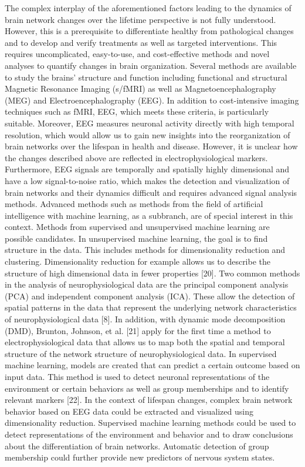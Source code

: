The complex interplay of the aforementioned factors leading to the dynamics of brain network changes over the lifetime perspective is not fully understood. However, this is a prerequisite to differentiate healthy from pathological changes and to develop and verify treatments as well as targeted interventions. This requires uncomplicated, easy-to-use, and cost-effective methods and novel analyses to quantify changes in brain organization. Several methods are available to study the brains' structure and function including functional and structural Magnetic Resonance Imaging (s/fMRI) as well as Magnetoencephalography (MEG) and Electroencephalography (EEG). In addition to cost-intensive imaging techniques such as fMRI, EEG, which meets these criteria, is particularly suitable.
Moreover, EEG measures neuronal activity directly with high temporal resolution, which would allow us to gain new insights into the reorganization of brain networks over the lifespan in health and disease. However, it is unclear how the changes described above are reflected in electrophysiological markers. Furthermore, EEG signals are temporally and spatially highly dimensional and have a low signal-to-noise ratio, which makes the detection and visualization of brain networks and their dynamics difficult and requires advanced signal analysis methods. 
Advanced methods such as methods from the field of artificial intelligence with machine learning, as a subbranch, are of special interest in this context. Methods from supervised and unsupervised machine learning are possible candidates. In unsupervised machine learning, the goal is to find structure in the data. This includes methods for dimensionality reduction and clustering. Dimensionality reduction for example allows us to describe the structure of high dimensional data in fewer properties [20]. Two common methods in the analysis of neurophysiological data are the principal component analysis (PCA) and independent component analysis (ICA). These allow the detection of spatial patterns in the data that represent the underlying network characteristics of neurophysiological data [8]. In addition, with dynamic mode decomposition (DMD), Brunton, Johnson, et al. [21] apply for the first time a method to electrophysiological data that allows us to map both the spatial and temporal structure of the network structure of neurophysiological data.
In supervised machine learning, models are created that can predict a certain outcome based on input data. This method is used to detect neuronal representations of the environment or certain behaviors as well as group memberships and to identify relevant markers [22].
In the context of lifespan changes, complex brain network behavior based on EEG data could be extracted and visualized using dimensionality reduction. Supervised machine learning methods could be used to detect representations of the environment and behavior and to draw conclusions about the differentiation of brain networks. Automatic detection of group membership could further provide new predictors of nervous system states.

